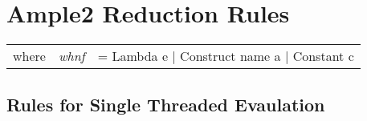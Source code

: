 \documentclass{llncs}
\begin{document}
	
\newcommand\rruleH[9] {
	\noindent \textbf {#1}
	\par
	\medskip
	\noindent
	\begin{tabular} {p{ 5mm} p{40mm} p{ 2mm} p{30mm} p{20mm} p{15mm} p{ 2mm}}	
			& #2 & ( & #3, & \raggedleft{#4}, & \raggedleft{#5} & ) \\
	$\Rightarrow$	& #6 & ( & #7, & \raggedleft{#8}, & \raggedleft{#9} & ) 
	\end{tabular}
	\\
}


\newcommand\rruleHH[9] {
	\noindent \textbf {#1}
	\par
	\medskip
	\noindent
	\begin{tabular} {p{ 5mm} p{50mm} p{ 2mm} p{30mm} p{10mm} p{15mm} p{ 2mm}}	
			& #2 & ( & #3, & \raggedleft{#4}, & \raggedleft{#5} & ) \\
	$\Rightarrow$	& #6 & ( & #7, & \raggedleft{#8}, & \raggedleft{#9} & ) 
	\end{tabular}
	\\
}


\newcommand\rruleE[9] {
	\noindent \textbf {#1}
	\par
	\medskip
	\noindent
	\begin{tabular} {p{ 5mm} p{10mm} p{ 2mm} p{30mm} p{50mm} p{10mm} p{ 2mm}}	
			& #2 & ( & #3, & \raggedleft{#4}, & \raggedleft{#5} & ) \\
	$\Rightarrow$	& #6 & ( & #7, & \raggedleft{#8}, & \raggedleft{#9} & ) 
	\end{tabular}
	\\
}


\newcommand\blocked		{$\bullet$}
\newcommand\blockedon[1]	{$\bullet \, _{#1}$}
\newcommand\bind		{$\rightarrow \:$}
\newcommand\px			{p$_x$}


\clearpage
\section{Ample2 Reduction Rules}

\begin{tabular}{p{10mm}ll}
where	& \emph{whnf} 	& = Lambda e $|$ Construct name a $|$ Constant c
\end{tabular}

\subsection{Rules for Single Threaded Evaulation}
\end{document}
